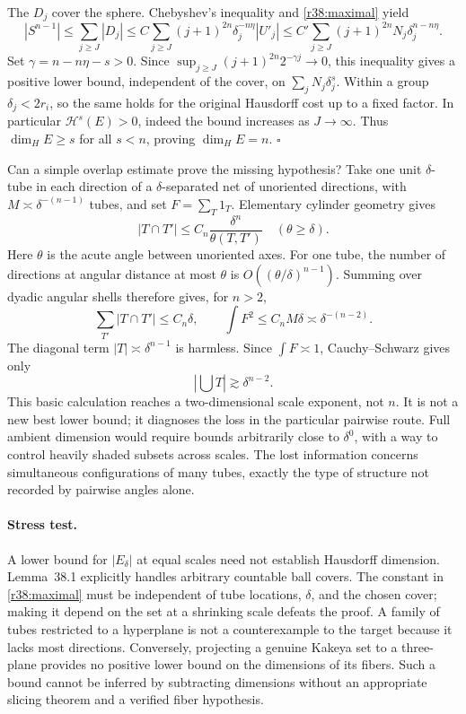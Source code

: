 \documentclass[11pt,a4paper]{article}
\numberwithin{equation}{section}
\begin{document}
The $D_j$ cover the sphere. Chebyshev's inequality and
\eqref{r38:maximal} yield
\[
 |S^{n-1}|\le\sum_{j\ge J}|D_j|
 \le C\sum_{j\ge J}(j+1)^{2n}\delta_j^{-n\eta}|U'_j|
 \le C'\sum_{j\ge J}(j+1)^{2n}N_j\delta_j^{n-n\eta}.
\]
Set $\gamma=n-n\eta-s>0$. Since
$\sup_{j\ge J}(j+1)^{2n}2^{-\gamma j}\to0$, this inequality gives a
positive lower bound, independent of the cover, on
$\sum_jN_j\delta_j^s$. Within a group $\delta_j<2r_i$, so the same holds
for the original Hausdorff cost up to a fixed factor. In particular
$\mathcal H^s(E)>0$, indeed the bound increases as $J\to\infty$.
Thus $\dim_HE\ge s$ for all $s<n$, proving $\dim_HE=n$.
\hfill$\square$

Can a simple overlap estimate prove the missing hypothesis? Take one unit
$\delta$-tube in each direction of a $\delta$-separated net of unoriented directions,
with $M\asymp\delta^{-(n-1)}$ tubes, and set $F=\sum_T1_T$. Elementary
cylinder geometry gives
\[
 |T\cap T'|\le C_n\frac{\delta^n}{\theta(T,T')}
 \quad(\theta\ge\delta).
\]
Here $\theta$ is the acute angle between unoriented axes. For one tube,
the number of directions at angular distance at most $\theta$
is $O((\theta/\delta)^{n-1})$. Summing over dyadic angular shells therefore
gives, for $n>2$,
\[
 \sum_{T'}|T\cap T'|\le C_n\delta,
 \qquad \int F^2\le C_nM\delta\asymp\delta^{-(n-2)}.
\]
The diagonal term $|T|\asymp\delta^{n-1}$ is harmless. Since
$\int F\asymp1$, Cauchy--Schwarz gives only
\[
 \left|\bigcup T\right|\gtrsim\delta^{n-2}.
\]
This basic calculation reaches a two-dimensional scale exponent, not $n$.
It is not a new best lower bound; it diagnoses the loss in the particular
pairwise route. Full ambient dimension would require bounds arbitrarily
close to $\delta^0$, with a way to control heavily shaded subsets across
scales. The lost information concerns simultaneous configurations of many
tubes, exactly the type of structure not recorded by pairwise angles alone.

\paragraph{Stress test.}
A lower bound for $|E_\delta|$ at equal scales need not establish Hausdorff
dimension. Lemma~38.1 explicitly handles arbitrary countable ball covers.
The constant in \eqref{r38:maximal} must be independent of tube locations,
$\delta$, and the chosen cover; making it depend on the set at a shrinking
scale defeats the proof. A family of tubes restricted to a hyperplane is
not a counterexample to the target because it lacks most directions.
Conversely, projecting a genuine Kakeya set to a three-plane provides no
positive lower bound on the dimensions of its fibers. Such a bound cannot
be inferred by subtracting dimensions without an appropriate slicing theorem
and a verified fiber hypothesis.
\end{document}
